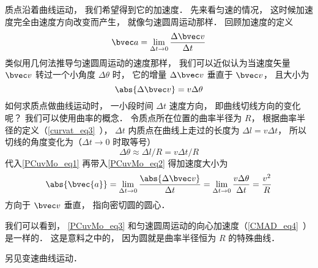 

质点沿着曲线运动， 我们希望得到它的加速度． 先来看匀速的情况， 这时候加速度完全由速度方向改变而产生， 就像匀速圆周运动那样． 回顾加速度的定义
\begin{equation}\label{PCuvMo_eq2}
\bvec a = \lim_{\Delta t \to 0} \frac{\Delta \bvec v}{\Delta t}
\end{equation}
类似用几何法推导匀速圆周运动的速度那样， 我们可以近似认为当速度矢量 $\bvec v$ 转过一个小角度 $\Delta \theta$ 时， 它的增量 $\Delta \bvec v$ 垂直于 $\bvec v$， 且大小为
\begin{equation}\label{PCuvMo_eq1}
\abs{\Delta \bvec v} = v\Delta\theta
\end{equation}
如何求质点做曲线运动时， 一小段时间 $\Delta t$ 速度方向， 即曲线切线方向的变化呢？ 我们可以使用曲率的概念． 令质点所在位置的曲率半径为 $R$， 根据曲率半径的定义（\autoref{curvat_eq3}~）， $\Delta t$ 内质点在曲线上走过的长度为 $\Delta l = v \Delta t$， 所以切线的角度变化为（$\Delta t\to 0$ 时取等号）
\begin{equation}
\Delta \theta \approx \Delta l/R = v \Delta t/R
\end{equation}
代入\autoref{PCuvMo_eq1} 再带入\autoref{PCuvMo_eq2} 得加速度大小为
\begin{equation}\label{PCuvMo_eq3}
\abs{\bvec{a}} = \lim_{\Delta t \to 0} \frac{\abs{\Delta \bvec v}}{\Delta t}
= \lim_{\Delta t \to 0}  \frac{v\Delta\theta}{\Delta t} = \frac{v^2}{R}
\end{equation}
方向于 $\bvec v$ 垂直， 指向密切圆的圆心．

我们可以看到， \autoref{PCuvMo_eq3} 和匀速圆周运动的向心加速度（\autoref{CMAD_eq4}~）是一样的． 这是意料之中的， 因为圆就是曲率半径恒为 $R$ 的特殊曲线．

另见变速曲线运动．
